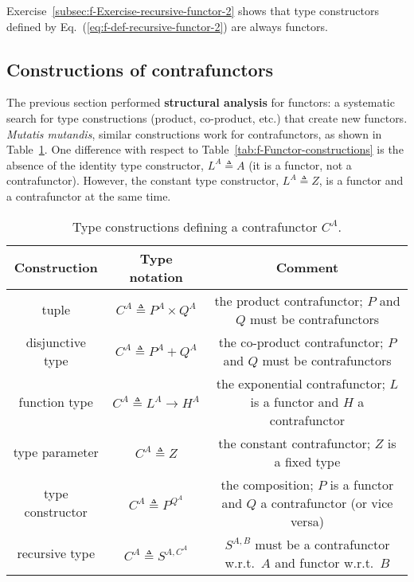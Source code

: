 Exercise~\ref{subsec:f-Exercise-recursive-functor-2} shows that
type constructors defined by Eq.~(\ref{eq:f-def-recursive-functor-2})
are always functors.

\subsection{Constructions of contrafunctors\label{subsec:f-Contrafunctor-constructions}}

The previous section performed \textbf{structural analysis}
for functors: a systematic search for type constructions (product,
co-product, etc.) that create new functors.\emph{ Mutatis mutandis},
similar constructions work for contrafunctors, as shown in Table~\ref{tab:f-Contrafunctor-constructions}.
One difference with respect to Table~\ref{tab:f-Functor-constructions}
is the absence of the identity type constructor, $L^{A}\triangleq A$
(it is a functor, not a contrafunctor). However, the constant type
constructor, $L^{A}\triangleq Z$, is a functor and a contrafunctor
at the same time.

\begin{table}
\begin{centering}
\begin{tabular}{|c|c|c|}
\hline 
\textbf{\small{}Construction} & \textbf{\small{}Type notation} & \textbf{\small{}Comment}\tabularnewline
\hline 
\hline 
{\footnotesize{}tuple} & {\footnotesize{}$C^{A}\triangleq P^{A}\times Q^{A}$} & {\footnotesize{}the product contrafunctor; $P$ and $Q$ must be contrafunctors}\tabularnewline
\hline 
{\footnotesize{}disjunctive type} & {\footnotesize{}$C^{A}\triangleq P^{A}+Q^{A}$} & {\footnotesize{}the co-product contrafunctor; $P$ and $Q$ must be
contrafunctors}\tabularnewline
\hline 
{\footnotesize{}function type} & {\footnotesize{}$C^{A}\triangleq L^{A}\rightarrow H^{A}$} & {\footnotesize{}the exponential contrafunctor; $L$ is a functor and
$H$ a contrafunctor}\tabularnewline
\hline 
{\footnotesize{}type parameter} & {\footnotesize{}$C^{A}\triangleq Z$} & {\footnotesize{}the constant contrafunctor; $Z$ is a fixed type}\tabularnewline
\hline 
{\footnotesize{}type constructor} & {\footnotesize{}$C^{A}\triangleq P^{Q^{A}}$} & {\footnotesize{}the composition; $P$ is a functor and $Q$ a contrafunctor
(or vice versa)}\tabularnewline
\hline 
{\footnotesize{}recursive type} & {\footnotesize{}$C^{A}\triangleq S^{A,C^{A}}$} & {\footnotesize{}$S^{A,B}$ must be a contrafunctor w.r.t.~$A$ and
functor w.r.t.~$B$}\tabularnewline
\hline 
\end{tabular}
\par\end{centering}
\caption{Type constructions defining a contrafunctor $C^{A}$.\label{tab:f-Contrafunctor-constructions}}
\end{table}

